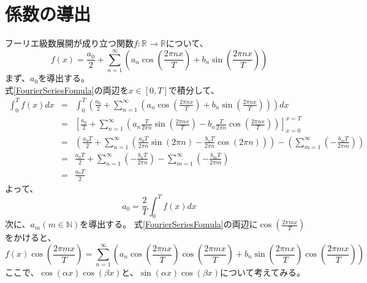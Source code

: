 \documentclass[a4paper]{jsarticle}
\begin{document}
\section{係数の導出}
フーリエ級数展開が成り立つ関数$f: \mathbb{R} \longrightarrow \mathbb{R}$について、
\begin{equation}
f \left( x \right) = \frac { a_0 } { 2 } + \sum _{ n = 1} ^{ \infty } \left( a_n \cos( \frac { 2 \pi nx } { T } ) + b_n \sin( \frac { 2 \pi nx } { T } ) \right)
\end{equation}
まず、$a_0$を導出する。\\
式\ref{FourierSeriesFomula}の両辺を$x \in \left[ 0,T \right]$で積分して、
\begin{eqnarray}
	\int _0 ^T f \left( x \right) dx &=& \int _0 ^T \left( \frac { a_0 } { 2 } + \sum _{ n = 1} ^{ \infty } \left( a_n \cos( \frac { 2 \pi nx } { T } ) + b_n \sin( \frac { 2 \pi nx } { T } ) \right) \right) dx \nonumber \\
	&=& \left[ \frac { a_0 } { 2 } + \sum _{ n = 1} ^\infty \left( a_n \frac { T } { 2 \pi n } \sin( \frac { 2 \pi nx } { T } ) - b_n \frac { T } { 2 \pi n } \cos( \frac { 2 \pi nx } { T } ) \right) \right] _{ x = 0 } ^{ x = T } \nonumber \\
	&=& \left( \frac { a_0T } { 2 } + \sum _{ n = 1 } ^\infty \left( \frac { a_0T } { 2 \pi n } \sin( 2 \pi n ) - \frac { b_nT } { 2 \pi n } \cos( 2 \pi n) \right) \right) - \left( \sum _{ m = 1 } ^\infty \left( - \frac { b_mT } { 2 \pi m } \right) \right) \nonumber \\
	&=& \frac { a_0T } { 2 } + \sum _{ n = 1 } ^\infty \left( - \frac { b_nT } { 2 \pi n } \right) - \sum _{ m = 1 } ^\infty \left( - \frac { b_mT } { 2 \pi m } \right) \nonumber \\
	&=& \frac { a_0T } { 2 }
\end{eqnarray}
よって、
\begin{equation}
a_0 = \frac { 2 } { T } \int _0 ^T f \left( x \right) dx
\end{equation}
次に、$a_m \left( m \in \mathbb{N} \right)$を導出する。
式\ref{FourierSeriesFomula}の両辺に$\cos(\frac { 2 \pi mx } { T })$をかけると、
\begin{equation}
	f \left( x \right) \cos(\frac { 2 \pi mx } { T }) = \sum _{ n = 1 } ^\infty \left( a_n \cos(\frac { 2 \pi nx } { T }) \cos(\frac { 2 \pi mx } { T }) + b_n \sin(\frac { 2 \pi nx } { T }) \cos(\frac { 2 \pi mx } { T }) \right)
\end{equation}
ここで、$\cos(\alpha x) \cos(\beta x)$と、$\sin(\alpha x) \cos(\beta x)$について考えてみる。\\
\end{document}
